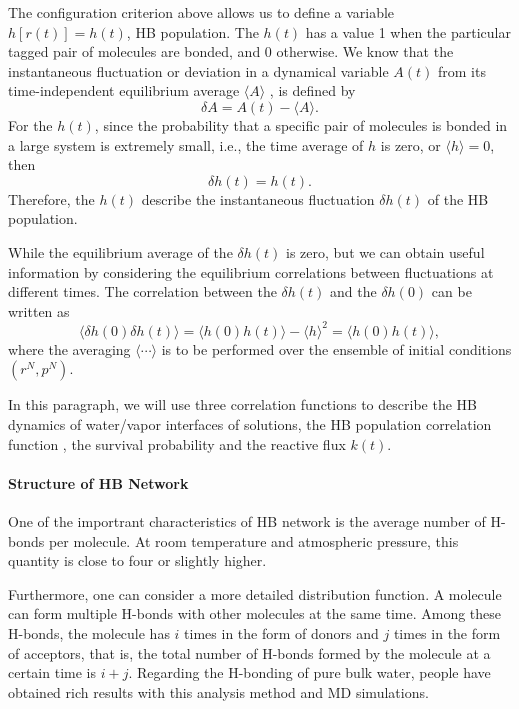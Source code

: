 The configuration criterion above allows us to define a variable $h[r(t)] = h(t)$, HB population. 
The $h(t)$ has a value 1 when the particular tagged pair of molecules are bonded, and 0 otherwise. 
We know that the instantaneous fluctuation or deviation in a dynamical variable $A(t)$ from its time-independent equilibrium average $\langle A\rangle$ , 
is defined by \cite{DC87} 
$$
\delta A = A(t) - \langle A\rangle.
$$
For the $h(t)$, since the probability that a specific pair of molecules is bonded in a large system is extremely small, i.e., 
the time average of $h$ is zero, or  
$\langle h \rangle = 0$,
then
$$
\delta h(t) = h(t).
$$
Therefore, the $h(t)$ describe the instantaneous fluctuation $\delta h(t)$  of the HB population.  

While the equilibrium average of the $\delta h(t)$ is zero, but we can obtain useful information by considering the equilibrium 
correlations between fluctuations at different times. The correlation between the $\delta h(t)$ and the $\delta h(0)$ can be written as 
$$
\langle \delta h(0) \delta h(t)\rangle = \langle h(0)h(t)\rangle-\langle h \rangle^2 = \langle h(0)h(t)\rangle,
$$
where the averaging $\langle\cdots\rangle$ is to be performed over the ensemble of initial conditions $(r^N, p^N)$.


In this paragraph, we will use three correlation functions to describe the HB dynamics of water/vapor interfaces of solutions,
the HB population correlation function \CHB, the survival probability \SHB and the reactive flux $k(t)$. \cite{Rapaport1983}

\FloatBarrier
\paragraph{Structure of HB Network}
One of the importrant characteristics of HB network is the average number of H-bonds per molecule. 
At room temperature and atmospheric pressure, this quantity is close to four or slightly higher. \cite{Malenkov2006} 

Furthermore, one can consider a more detailed distribution function. A molecule can form multiple H-bonds with other molecules at the same time.
 Among these H-bonds, the molecule has $i$ times in the form of donors and $j$ times in the form of acceptors, 
that is, the total number of H-bonds formed by the molecule at a certain time is $i+j$.
Regarding the H-bonding of pure bulk water, people have obtained rich results with this analysis method and MD simulations. \cite{Malenkov1990,Malenkov2006}

